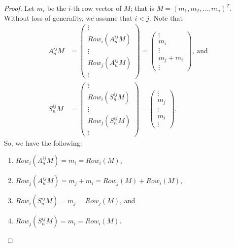 \begin{proof}
	Let $ m_i $ be the $ i $-th row vector of $ M $; that is $ M=(m_1,m_2,…,m_n )^T $. Without loss of generality, we assume that $ i<j $. Note that
	\begin{align*}
	A_n^{ij} M &= \left(\begin{matrix}
	\vdots \\
	Row_i (A_n^{ij}M) \\
	\vdots \\
	Row_j (A_n^{ij}M) \\
	\vdots
	\end{matrix}\right)
	= \left(\begin{matrix}
	\vdots \\
	m_i \\
	\vdots \\
	m_j + m_i \\
	\vdots
	\end{matrix}\right),\ \text{and} \\
	S_n^{ij} M &= \left(\begin{matrix}
	\vdots \\
	Row_i (S_n^{ij}M) \\
	\vdots \\
	Row_j (S_n^{ij}M) \\
	\vdots
	\end{matrix}\right)
	= \left(\begin{matrix}
	\vdots \\
	m_j \\
	\vdots \\
	m_i \\
	\vdots
	\end{matrix}\right).
	\end{align*}
	So, we have the following:
	\begin{enumerate}[label=(\roman*)]
		\item $ Row_i (A_n^{ij} M)=m_i=Row_i (M) $,
		\item $ Row_j (A_n^{ij} M)=m_j+m_i=Row_j (M)+Row_i (M) $,
		\item $ Row_i (S_n^{ij} M)=m_j=Row_j (M) $, and
		\item $ Row_j (S_n^{ij} M)=m_i=Row_i (M) $.
	\end{enumerate}
\end{proof}

